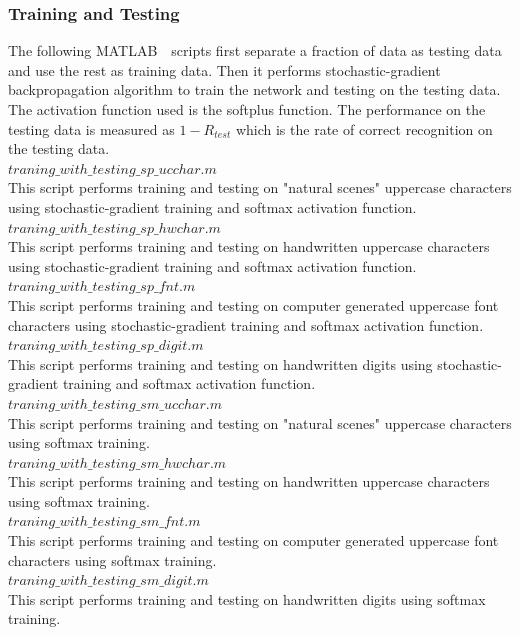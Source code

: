 \documentclass[journal,a4paper,onecolumn,11pt]{IEEEtran}
\begin{document}
\subsubsection{Training and Testing}
The following MATLAB　scripts first separate a fraction of data as testing data and use the rest as training data. Then it performs stochastic-gradient backpropagation algorithm to train the network and testing on the testing data. The activation function used is the softplus function. The performance on the testing data is measured as $1 - R_{test}$ which is the rate of correct recognition on the testing data.\\
$traning\_with\_testing\_sp\_ucchar.m$\\
This script performs training and testing on "natural scenes" uppercase characters using stochastic-gradient training and softmax activation function.\\ 
$traning\_with\_testing\_sp\_hwchar.m$\\
This script performs training and testing on handwritten uppercase characters using stochastic-gradient training and softmax activation function.\\ 
$traning\_with\_testing\_sp\_fnt.m$\\
This script performs training and testing on computer generated uppercase font characters using stochastic-gradient training and softmax activation function.\\ 
$traning\_with\_testing\_sp\_digit.m$\\
This script performs training and testing on handwritten digits using stochastic-gradient training and softmax activation function.\\ 
$traning\_with\_testing\_sm\_ucchar.m$\\
This script performs training and testing on "natural scenes" uppercase characters using softmax training.\\ 
$traning\_with\_testing\_sm\_hwchar.m$\\
This script performs training and testing on handwritten uppercase characters using softmax training.\\ 
$traning\_with\_testing\_sm\_fnt.m$\\
This script performs training and testing on computer generated uppercase font characters using softmax training.\\ 
$traning\_with\_testing\_sm\_digit.m$\\
This script performs training and testing on handwritten digits using softmax training.\\ 
\end{document}
